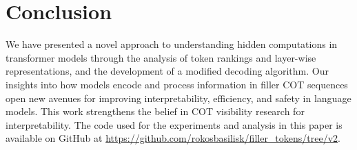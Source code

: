 \documentclass[10pt,a4paper]{article}
\begin{document}
\section{Conclusion}
We have presented a novel approach to understanding hidden computations in transformer models through the analysis of token rankings and layer-wise representations, and the development of a modified decoding algorithm. Our insights into how models encode and process information in filler COT sequences open new avenues for improving interpretability, efficiency, and safety in language models. This work strengthens the belief in COT visibility research for interpretability.
\vfill
The code used for the experiments and analysis in this paper is available on GitHub at \href{https://github.com/rokosbasilisk/filler_tokens/tree/v2}{https://github.com/rokosbasilisk/filler\_tokens/tree/v2}.
\clearpage
\end{document}
